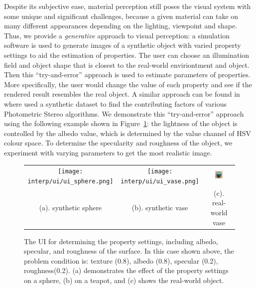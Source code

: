 Despite its subjective ease, material perception still poses the visual system with some unique and significant challenges, because a given material can take on many different appearances depending on the lighting, viewpoint and shape. Thus, we provide a \textit{generative} approach to visual perception: a simulation software is used to generate images of a synthetic object with varied property settings to aid the estimation of properties. The user can choose an illumination field and object shape that is closest to the real-world enviriontment and object. Then this ``try-and-error'' approach is used to estimate parameters of properties. More specifically, the user would change the value of each property and see if the rendered result resembles the real object. A similar approach can be found in~\cite{Berkiten:2016:ARB} where \citeauthor{Berkiten:2016:ARB} used a synthetic dataset to find the contributing factors of various Photometric Stereo algorithms. We demonstrate this ``try-and-error'' approach using the following example shown in Figure~\ref{fig:prop_estimate}:  the lightness of the object is controlled by the albedo value, which is determined by the value channel of HSV colour space. To determine the specularity and roughness of the object, we experiment with varying parameters to get the most realistic image.
\begin{figure}[!htbp]
\centering
\begin{tabular}{ccc}
  \texttt{[image: interp/ui/ui\_sphere.png]}&
  \texttt{[image: interp/ui/ui\_vase.png]}&
  \includegraphics[width=0.3\textwidth]{img/interp/real_world_img/vase/vase.jpg}\\
  (a). synthetic sphere & (b). synthetic vase & (c). real-world vase\\
\end{tabular}
\caption{The UI for determining the property settings, including albedo, specular, and roughness of the surface. In this case shown above, the problem condition is: texture (0.8), albedo (0.8), specular (0.2), roughness(0.2). (a) demonstrates the effect of the property settings on a sphere, (b) on a teapot, and (c) shows the real-world object.}
\label{fig:prop_estimate}
\end{figure}

